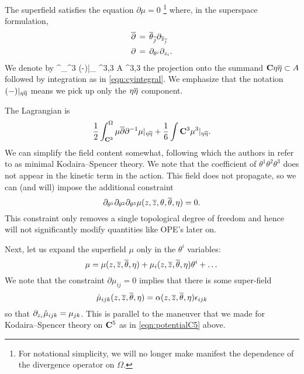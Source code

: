 \documentclass[../main.tex]{subfiles}
\begin{document}
The superfield satisfies the equation $\partial \mu = 0$ \footnote{For notational simplicity, we will no longer make manifest the dependence of the divergence operator on $\Omega$.}
where, in the superspace formulation,
\begin{align} 
	\overline{\partial} & \, = \, \overline{\theta}_{\overline{j}} \partial_{{\overline{z}}_{\overline{j}}} \\
	\partial &\, = \, \partial_{\theta^i} \partial_{z_i}.  
\end{align}
We denote by
\beqn
\int^\Omega_{\C^3} (-)|_{\eta \br \eta} \colon \PV^{3,3} \otimes A \to \eta \br \eta \PV^{3,3}  \to \C
\eeqn
the projection onto the summand $\mathbf{C} \eta \overline \eta \subset A$ followed by integration as in \eqref{eqn:cyintegral}.
We emphasize that the notation $(-)|_{\eta \overline{\eta}}$ means we pick up only the $\eta \overline{\eta}$ component.


The Lagrangian is
	\begin{equation} 
		\frac{1}{2} \int^\Omega_{\mathbf{C}^3} \mu \overline{\partial} \partial^{-1} \mu |_{\eta \overline \eta} + \frac{1}{6} \int{\mathbf{C}^3} \mu^3 |_{\eta \overline \eta} .
	\end{equation}
We can simplify the field content somewhat, following \cite{CostelloGaiotto} which the authors in \cite{CLsugra} refer to as minimal Kodaira--Spencer theory.
We note that the coefficient of $\theta^1 \theta^2 \theta^3$ does not appear in the kinetic term in the action.  
This field does not propagate, so we can (and will) impose the additional constraint
\begin{equation}\label{eq:nonprop} 
	\partial_{\theta^1} \partial_{\theta^2} \partial_{\theta^3} \mu (z,{\overline{z}},\theta,\overline{\theta},\eta) = 0. 
\end{equation}
This constraint only removes a single topological degree of freedom and hence will not significantly modify quantities like OPE's later on.

Next, let us expand the superfield $\mu$ only in the $\theta^i$ variables:
\begin{equation} 
	\mu = \mu(z,{\overline{z}},\overline{\theta},\eta) + \mu_{i}(z,{\overline{z}},\overline{\theta},\eta) \theta^i + \dots 
\end{equation}
We note that the constraint $\partial \mu_{ij} = 0$ implies that there is some super-field
\begin{equation} 
	\Hat{\mu}_{ijk}(z,{\overline{z}},\overline{\theta},\eta) = 	\alpha(z,{\overline{z}},\overline{\theta},\eta) {\epsilon}_{ijk}   
\end{equation}
so that $\partial_{z_i} \Hat{\mu}_{ijk} = \mu_{jk}$. 
This is parallel to the maneuver that we made for Kodaira--Spencer theory on $\mathbf{C}^5$ as in \eqref{eqn:potentialC5} above.
\end{document}
